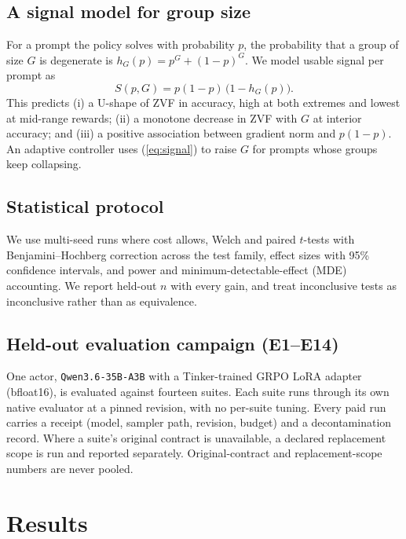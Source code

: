 \documentclass[conference]{IEEEtran}
\begin{document}
\subsection{A signal model for group size}
For a prompt the policy solves with probability $p$, the probability that a
group of size $G$ is degenerate is $h_G(p) = p^G + (1-p)^G$. We model usable
signal per prompt as
\begin{equation}
S(p, G) = p(1-p)\,\bigl(1 - h_G(p)\bigr).
\label{eq:signal}
\end{equation}
This predicts (i) a U-shape of ZVF in accuracy, high at both extremes and
lowest at mid-range rewards; (ii) a monotone decrease in ZVF with $G$ at
interior accuracy; and (iii) a positive association between gradient norm and
$p(1-p)$. An adaptive controller uses (\ref{eq:signal}) to raise $G$ for
prompts whose groups keep collapsing.

\subsection{Statistical protocol}
We use multi-seed runs where cost allows, Welch and paired $t$-tests with
Benjamini--Hochberg correction across the test family, effect sizes with 95\%
confidence intervals, and power and minimum-detectable-effect (MDE)
accounting. We report held-out $n$ with every gain, and treat
inconclusive tests as inconclusive rather than as equivalence.

\subsection{Held-out evaluation campaign (E1--E14)}
One actor, \texttt{Qwen3.6-35B-A3B} with a Tinker-trained GRPO LoRA adapter
(bfloat16), is evaluated against fourteen suites. Each suite runs through its
own native evaluator at a pinned revision, with no per-suite tuning. Every
paid run carries a receipt (model, sampler path, revision, budget) and a
decontamination record. Where a suite's original contract is unavailable, a
declared replacement scope is run and reported separately. Original-contract
and replacement-scope numbers are never pooled.

\section{Results}
\end{document}
